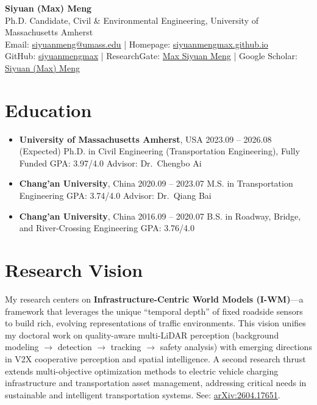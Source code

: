 \documentclass[11pt,a4paper]{article}
\begin{document}
\begin{center}
{\LARGE \textbf{Siyuan (Max) Meng}} \\[4pt]
Ph.D. Candidate, Civil \& Environmental Engineering, University of Massachusetts Amherst\\[2pt]
Email: \href{mailto:siyuanmeng@umass.edu}{siyuanmeng@umass.edu} \quad|\quad 
Homepage: \href{https://siyuanmengmax.github.io/}{siyuanmengmax.github.io}\\[2pt]
GitHub: \href{https://github.com/siyuanmengmax}{siyuanmengmax} \quad|\quad
ResearchGate: \href{https://www.researchgate.net/profile/Max-Siyuan-Meng}{Max Siyuan Meng}
\quad|\quad
Google Scholar: \href{https://scholar.google.com/citations?user=9L4TQh0AAAAJ&hl=en}{Siyuan (Max) Meng}
\end{center}

\section*{Education}
\begin{itemize}[leftmargin=1.2em]
    \item \textbf{University of Massachusetts Amherst}, USA \hfill 2023.09 -- 2026.08 (Expected)  
    Ph.D. in Civil Engineering (Transportation Engineering), Fully Funded \quad GPA: 3.97/4.0  
    Advisor: Dr.\ Chengbo Ai
    
    \item \textbf{Chang'an University}, China \hfill 2020.09 -- 2023.07  
    M.S. in Transportation Engineering \quad GPA: 3.74/4.0  
    Advisor: Dr.\ Qiang Bai

    \item \textbf{Chang'an University}, China \hfill 2016.09 -- 2020.07  
    B.S. in Roadway, Bridge, and River-Crossing Engineering \quad GPA: 3.76/4.0
\end{itemize}

\section*{Research Vision}
My research centers on \textbf{Infrastructure-Centric World Models (I-WM)}---a framework that leverages the unique ``temporal depth'' of fixed roadside sensors to build rich, evolving representations of traffic environments. This vision unifies my doctoral work on quality-aware multi-LiDAR perception (background modeling $\rightarrow$ detection $\rightarrow$ tracking $\rightarrow$ safety analysis) with emerging directions in V2X cooperative perception and spatial intelligence. A second research thrust extends multi-objective optimization methods to electric vehicle charging infrastructure and transportation asset management, addressing critical needs in sustainable and intelligent transportation systems. See: \href{https://arxiv.org/abs/2604.17651}{arXiv:2604.17651}.
\end{document}
